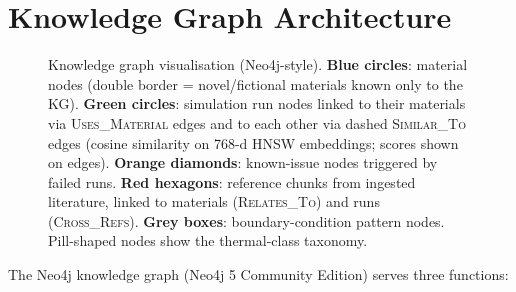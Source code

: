 \documentclass[twocolumn]{article}
\begin{document}
\section{Knowledge Graph Architecture}
\label{sec:kg}

\begin{figure}[htbp]
  \centering
  \resizebox{0.85\textwidth}{!}{}
  \caption{Knowledge graph visualisation (Neo4j-style).
    \textbf{Blue circles}: material nodes (double border = novel/fictional
    materials known only to the KG).
    \textbf{Green circles}: simulation run nodes linked to their materials
    via \textsc{Uses\_Material} edges and to each other via dashed
    \textsc{Similar\_To} edges (cosine similarity on 768-d HNSW embeddings;
    scores shown on edges).
    \textbf{Orange diamonds}: known-issue nodes triggered by failed runs.
    \textbf{Red hexagons}: reference chunks from ingested literature,
    linked to materials (\textsc{Relates\_To}) and runs (\textsc{Cross\_Refs}).
    \textbf{Grey boxes}: boundary-condition pattern nodes.
    Pill-shaped nodes show the thermal-class taxonomy.}
  \label{fig:kg}
\end{figure}

The Neo4j knowledge graph (Neo4j 5 Community Edition) serves three
functions:
\end{document}
